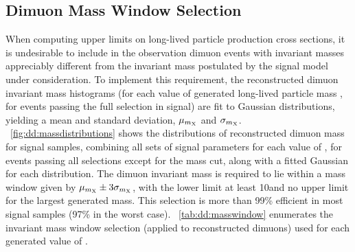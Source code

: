 \subsection{Dimuon Mass Window Selection}
\label{sec:dd:cutopt_mass}
When computing upper limits on long-lived particle production cross sections, it is undesirable to include in the observation dimuon events with invariant masses appreciably different from the invariant mass postulated by the signal model under consideration.
To implement this requirement, the reconstructed dimuon invariant mass histograms (for each value of generated long-lived particle mass \mX, for events passing the full selection in \twoMu signal) are fit to Gaussian distributions, yielding a mean and standard deviation, $\mu_{m_{\mathrm{X}}}$ and $\sigma_{m_{\mathrm{X}}}$.
\Fig~\ref{fig:dd:massdistributions} shows the distributions of reconstructed dimuon mass for \twoMu signal samples, combining all sets of signal parameters for each value of \mX, for events passing all selections except for the mass cut, along with a fitted Gaussian for each distribution.
The dimuon invariant mass is required to lie within a mass window given by $\mu_{m_{\mathrm{X}}} \pm 3\sigma_{m_{\mathrm{X}}}$, with the lower limit at least 10\GeV and no upper limit for the largest generated mass.
This selection is more than 99\% efficient in most \twoMu signal samples (97\% in the worst case).
\Tab~\ref{tab:dd:masswindow} enumerates the invariant mass window selection (applied to reconstructed dimuons) used for each generated value of \mX.

